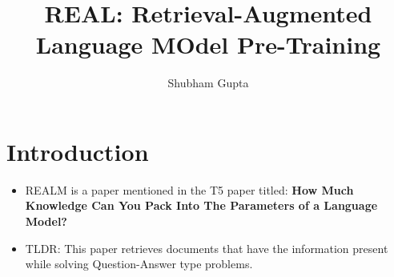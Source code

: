 \documentclass[a4paper]{article}
\title{REAL: Retrieval-Augmented Language MOdel Pre-Training}
\author{Shubham Gupta}
\begin{document}
\maketitle
\section{Introduction}
\begin{itemize}
    \item REALM is a paper mentioned in the T5 paper titled: \textbf{How Much Knowledge Can You Pack Into The Parameters of a Language Model?}
    \item TLDR: This paper retrieves documents that have the information present while solving Question-Answer type problems.
\end{itemize}
\end{document}
